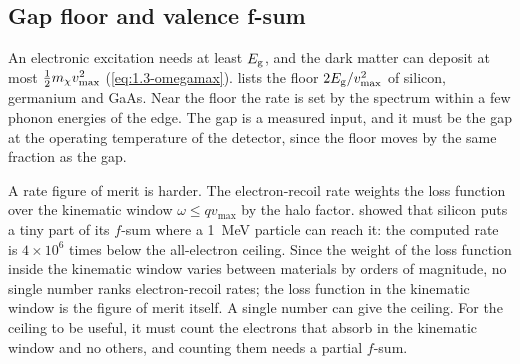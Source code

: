 \subsection{Gap floor and valence f-sum}\label{sec:17.5-electronic}

An electronic excitation needs at least $E_{\mathrm{g}}$, and the dark matter can deposit at most $\frac12m_{\chi} v_{\mathrm{max}}^2$ (\cref{eq:1.3-omegamax}).  lists the floor $2E_{\mathrm{g}}/v_{\mathrm{max}}^2$ of silicon, germanium and GaAs. Near the floor the rate is set by the spectrum within a few phonon energies of the edge. The gap is a measured input, and it must be the gap at the operating temperature of the detector, since the floor moves by the same fraction as the gap.

A rate figure of merit is harder. The electron-recoil rate weights the loss function over the kinematic window $\omega \le qv_{\mathrm{max}}$ by the halo factor.  showed that silicon puts a tiny part of its $f$-sum where a \SI{1}{MeV} particle can reach it: the computed rate is $4\times10^6$ times below the all-electron ceiling. Since the weight of the loss function inside the kinematic window varies between materials by orders of magnitude, no single number ranks electron-recoil rates; the loss function in the kinematic window is the figure of merit itself. A single number can give the ceiling. For the ceiling to be useful, it must count the electrons that absorb in the kinematic window and no others, and counting them needs a partial $f$-sum.


